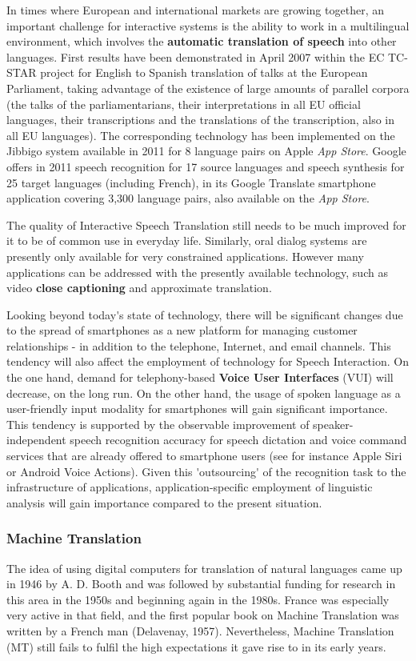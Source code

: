 \begin{multicols}{2}
In times where European and international markets are growing
together, an important challenge for interactive systems is the
ability to work in a multilingual environment, which involves the
{\bf automatic translation of speech} into other languages. First results
have been demonstrated in April 2007 within the EC TC-STAR\cite{tcstarurl} project
for English to Spanish translation of talks at the European
Parliament, taking advantage of the existence of large amounts of
parallel corpora (the talks of the parliamentarians, their
interpretations in all EU official languages, their transcriptions and
the translations of the transcription, also in all EU languages). The
corresponding technology has been implemented on the Jibbigo\cite{jibbigo} system
available in 2011 for 8 language pairs on Apple {\em App Store}. Google offers
in 2011 speech recognition for 17 source languages and speech synthesis
for 25 target languages (including French), in its Google Translate
smartphone application covering 3,300 language pairs, also available
on the {\em App Store}.

The quality of Interactive Speech Translation still needs to be much
improved for it to be of common use in everyday life. Similarly, oral
dialog systems are presently only available for very constrained
applications. However many applications can be addressed with the
presently available technology, such as video {\bf close captioning}
and approximate translation.

Looking beyond today{\mbox '}s state of technology, there will be
significant changes due to the spread of smartphones as a new platform
for managing customer relationships - in addition to the telephone,
Internet, and email channels. This tendency will also affect the
employment of technology for Speech Interaction. On the one hand,
demand for telephony-based {\bf Voice User Interfaces} (VUI) will
decrease, on the long run. On the other hand, the usage of spoken
language as a user-friendly input modality for smartphones will gain
significant importance. This tendency is supported by the observable
improvement of speaker-independent speech recognition accuracy for
speech dictation and voice command services that are already offered
to smartphone users (see for instance Apple Siri or Android Voice
Actions). Given this {\mbox '}outsourcing{\mbox '} of the recognition
task to the infrastructure of applications, application-specific
employment of linguistic analysis will gain importance compared to the
present situation.

\subsubsection{Machine Translation}
The idea of using digital computers for translation of natural
languages came up in 1946 by A. D. Booth and was followed by
substantial funding for research in this area in the 1950s and
beginning again in the 1980s. France was especially very active in
that field, and the first popular book on Machine Translation was
written by a French man (Delavenay, 1957). Nevertheless, Machine
Translation (MT) still fails to fulfil the high expectations it gave
rise to in its early years.


\end{multicols}

